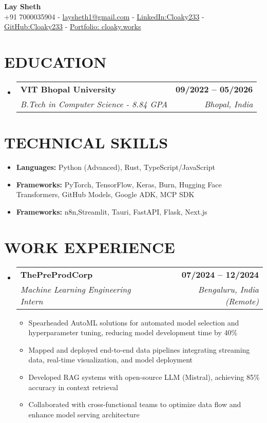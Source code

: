 \documentclass[letterpaper,11pt]{article}
\makeatletter
\def\spaceBelowHeaderContact{-2pt}
\def\spaceBelowEdSec{-8pt}
\def\spaceBelowTechSecContent{-8pt}
\def\spaceBetweenResumeItems{-4pt}
\def\spaceBetweenSubheadings{-1pt}
\def\spaceAfterSubheading{-7pt}
\newcommand{\resumeItem}[1]{
  \item\small{
    {#1 \vspace{\spaceBetweenResumeItems}}
  }
}
\newcommand{\resumeSubheading}[4]{
  \vspace{\spaceBetweenSubheadings}\item
    \begin{tabular*}{1.0\textwidth}[t]{l@{\extracolsep{\fill}}r}
      \textbf{\normalsize#1} & \textbf{\small #2} \\
      \textit{\normalsize#3} & \textit{\small #4} \\
    \end{tabular*}\vspace{\spaceAfterSubheading}
}
\newcommand{\resumeSubHeadingListStart}{\begin{itemize}[leftmargin=0.0in, label={}]}
\newcommand{\resumeSubHeadingListEnd}{\end{itemize}\vspace{\spaceBelowEdSec}}
\newcommand{\resumeItemListStart}{\begin{itemize}[leftmargin=0.1in]}
\newcommand{\resumeItemListEnd}{\end{itemize}\vspace{\spaceBelowTechSecContent}}
\makeatother
\begin{document}
\begin{center}
    {\huge \textbf{Lay Sheth}} \\ \vspace{1pt}
    {+91 7000035904}
    \small{ - }
    {\href{mailto://laysheth1@gmail.com}{laysheth1@gmail.com}}
    \small{ - }
    {\href{https://linkedin.com/in/cloaky233}{LinkedIn:Cloaky233}}
    \small{ - }
    {\href{https://github.com/CLoaKY233}{GitHub:Cloaky233}}
    \small{ - }
    {\href{https://cloaky.works}{Portfolio: cloaky.works}}
    \vspace{\spaceBelowHeaderContact}
\end{center}

\section{{EDUCATION}}
\resumeSubHeadingListStart
    \resumeSubheading
      {VIT Bhopal University}{09/2022 -- 05/2026}
      {B.Tech in Computer Science - 8.84 GPA}{Bhopal, India}
\resumeSubHeadingListEnd

\section{TECHNICAL SKILLS}



\resumeItemListStart
    \resumeItem{
        \textbf{Languages:} Python (Advanced), Rust, TypeScript/JavaScript}
        \resumeItem{\textbf{Frameworks:} PyTorch, TensorFlow, Keras, Burn, Hugging Face Transformers, GitHub Models, Google ADK, MCP SDK}
        \resumeItem{\textbf{Frameworks:} n8n,Streamlit, Tauri, FastAPI, Flask, Next.js}

\resumeItemListEnd
\vspace{-4pt}

\section{{WORK EXPERIENCE}}
\resumeSubHeadingListStart
    \resumeSubheading
      {ThePreProdCorp}{07/2024 -- 12/2024}
      {Machine Learning Engineering Intern}{Bengaluru, India (Remote)}
      \resumeItemListStart
        \resumeItem{Spearheaded AutoML solutions for automated model selection and hyperparameter tuning, reducing model development time by 40\%}
        \resumeItem{Mapped and deployed end-to-end data pipelines integrating streaming data, real-time visualization, and model deployment}
        \resumeItem{Developed RAG systems with open-source LLM (Mistral), achieving 85\% accuracy in context retrieval}
        \resumeItem{Collaborated with cross-functional teams to optimize data flow and enhance model serving architecture}
      \resumeItemListEnd
\resumeSubHeadingListEnd
\end{document}
